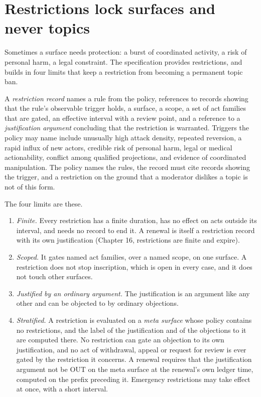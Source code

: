 \documentclass[11pt]{article}
\newcommand{\OUT}{\textsf{OUT}}
\begin{document}
\section{Restrictions lock surfaces and never topics}\label{sec:restrictions}

Sometimes a surface needs protection: a burst of coordinated activity, a risk of personal harm, a legal constraint. The specification provides restrictions, and builds in four limits that keep a restriction from becoming a permanent topic ban.

A \emph{restriction record} names a rule from the policy, references to records showing that the rule's observable trigger holds, a surface, a scope, a set of act families that are gated, an effective interval with a review point, and a reference to a \emph{justification argument} concluding that the restriction is warranted. Triggers the policy may name include unusually high attack density, repeated reversion, a rapid influx of new actors, credible risk of personal harm, legal or medical actionability, conflict among qualified projections, and evidence of coordinated manipulation. The policy names the rules, the record must cite records showing the trigger, and a restriction on the ground that a moderator dislikes a topic is not of this form.

The four limits are these.
\begin{enumerate}[nosep]
\item \emph{Finite.} Every restriction has a finite duration, has no effect on acts outside its interval, and needs no record to end it. A renewal is itself a restriction record with its own justification (Chapter 16, restrictions are finite and expire).
\item \emph{Scoped.} It gates named act families, over a named scope, on one surface. A restriction does not stop inscription, which is open in every case, and it does not touch other surfaces.
\item \emph{Justified by an ordinary argument.} The justification is an argument like any other and can be objected to by ordinary objections.
\item \emph{Stratified.} A restriction is evaluated on a \emph{meta surface} whose policy contains no restrictions, and the label of the justification and of the objections to it are computed there. No restriction can gate an objection to its own justification, and no act of withdrawal, appeal or request for review is ever gated by the restriction it concerns. A renewal requires that the justification argument not be \OUT{} on the meta surface at the renewal's own ledger time, computed on the prefix preceding it. Emergency restrictions may take effect at once, with a short interval.
\end{enumerate}
\end{document}
